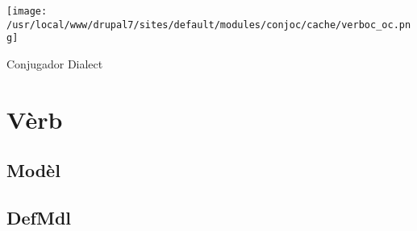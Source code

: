 \documentclass[10pt,a4paper,final]{article}
\author{Òsca-Font dubèrta}
\begin{document}
\begin{center}
\texttt{[image: /usr/local/www/drupal7/sites/default/modules/conjoc/cache/verboc\_oc.png]}
\end{center}

\begin{center}
\huge{Conjugador Dialect}
\end{center}

\section*{Vèrb}
\subsection*{Modèl}
\subsection*{DefMdl}
\end{document}
